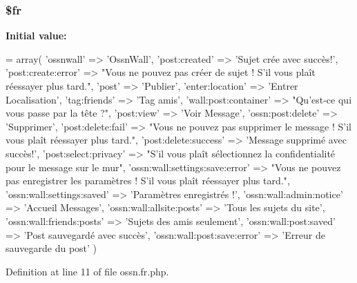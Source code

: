 \subsubsection[{\texorpdfstring{\$fr}{$fr}}]{\setlength{\rightskip}{0pt plus 5cm}\$fr}\hypertarget{components_2_ossn_wall_2locale_2ossn_8fr_8php_ad5107c697816e7b7f89ad1b3e94e3e0e}{}\label{components_2_ossn_wall_2locale_2ossn_8fr_8php_ad5107c697816e7b7f89ad1b3e94e3e0e}
{\bfseries Initial value\+:}
\begin{DoxyCode}
= array(
    \textcolor{stringliteral}{'ossnwall'} => \textcolor{stringliteral}{'OssnWall'},
    \textcolor{stringliteral}{'post:created'} => \textcolor{stringliteral}{'Sujet crée avec succès!'},
    \textcolor{stringliteral}{'post:create:error'} => \textcolor{stringliteral}{"Vous ne pouvez pas créer de sujet ! S'il vous plaît réessayer plus tard."},
    \textcolor{stringliteral}{'post'} => \textcolor{stringliteral}{'Publier'},
    \textcolor{stringliteral}{'enter:location'} => \textcolor{stringliteral}{'Entrer Localisation'},
    \textcolor{stringliteral}{'tag:friends'} => \textcolor{stringliteral}{'Tag amis'},
    \textcolor{stringliteral}{'wall:post:container'} => \textcolor{stringliteral}{"Qu'est-ce qui vous passe par la tête ?"},
    \textcolor{stringliteral}{'post:view'} => \textcolor{stringliteral}{'Voir Message'},
    \textcolor{stringliteral}{'ossn:post:delete'} => \textcolor{stringliteral}{'Supprimer'},
    \textcolor{stringliteral}{'post:delete:fail'} => \textcolor{stringliteral}{"Vous ne pouvez pas supprimer le message ! S'il vous plaît réessayer plus tard."},
    \textcolor{stringliteral}{'post:delete:success'} => \textcolor{stringliteral}{'Message supprimé avec succès!'},
    \textcolor{stringliteral}{'post:select:privacy'} => \textcolor{stringliteral}{"S'il vous plaît sélectionnez la confidentialité pour le message sur le mur"},
    \textcolor{stringliteral}{'ossn:wall:settings:save:error'} => \textcolor{stringliteral}{"Vous ne pouvez pas enregistrer les paramètres ! S'il vous plaît
       réessayer plus tard."},
    \textcolor{stringliteral}{'ossn:wall:settings:saved'} => \textcolor{stringliteral}{'Paramètres enregistrés !'},
    \textcolor{stringliteral}{'ossn:wall:admin:notice'} => \textcolor{stringliteral}{'Accueil Messages'},
    \textcolor{stringliteral}{'ossn:wall:allsite:posts'} => \textcolor{stringliteral}{'Tous les sujets du site'},
    \textcolor{stringliteral}{'ossn:wall:friends:posts'} => \textcolor{stringliteral}{'Sujets des amis seulement'},
    \textcolor{stringliteral}{'ossn:wall:post:saved'} => \textcolor{stringliteral}{'Post sauvegardé avec succès'},
    \textcolor{stringliteral}{'ossn:wall:post:save:error'} => \textcolor{stringliteral}{'Erreur de sauvegarde du post'}   
)
\end{DoxyCode}


Definition at line 11 of file ossn.\+fr.\+php.

